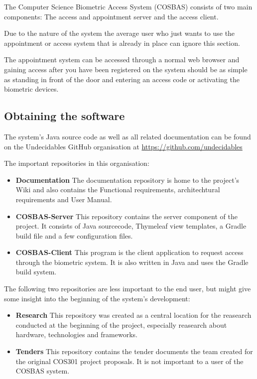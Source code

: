 The Computer Science Biometric Access System (COSBAS) consists of two main components: The access and appointment server and the access client.

Due to the nature of the system the average user who just wants to use the appointment or access system that is already in place can ignore this section.

The appointment system can be accessed through a normal web browser and gaining access after you have been registered on the system should be as simple as standing in front of the door and entering an access code or activating the biometric devices.

\subsection{Obtaining the software}
The system's Java source code as  well as all related documentation can be found on the Undecidables GitHub organisation at \url{https://github.com/undecidables}

The important repositories in this organisation:
\begin{itemize}

	\item \textbf{Documentation} The documentation repository is home to the project's Wiki and also contains the Functional requirements, architechtural requirements and User Manual.
	
	\item \textbf{COSBAS-Server} This repository contains the server component of the project. It consists of Java sourcecode, Thymeleaf view templates, a Gradle build file and  a few configuration files.

	\item \textbf{COSBAS-Client} This program is the client application to request access through the biometric system. It is also written in Java and uses the Gradle build system.

\end{itemize}

The following two repositories are less important to the end user, but might give some insight into the beginning of the system's development:
\begin{itemize}
	\item \textbf{Research} This repository was created as a central location for the reasearch conducted at the beginning of the project, especially reasearch about hardware, technologies and frameworks.
	\item \textbf{Tenders} This repository contains the tender documents the team created for the original COS301 project proposals. It is not important to a user of the COSBAS system.

\end{itemize}


